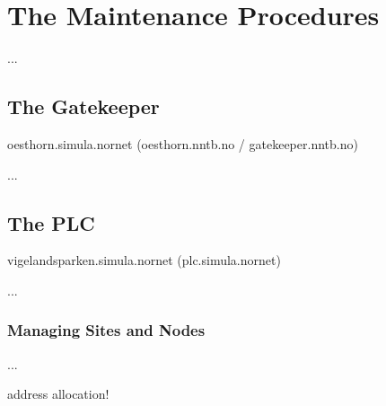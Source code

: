 
\chapter{The  Maintenance Procedures}
\label{cha:Maintenance}

...


\section{The Gatekeeper}

oesthorn.simula.nornet (oesthorn.nntb.no / gatekeeper.nntb.no)

...



\section{The PLC}

vigelandsparken.simula.nornet (plc.simula.nornet)

...

\subsection{Managing Sites and Nodes}

...

address allocation!

